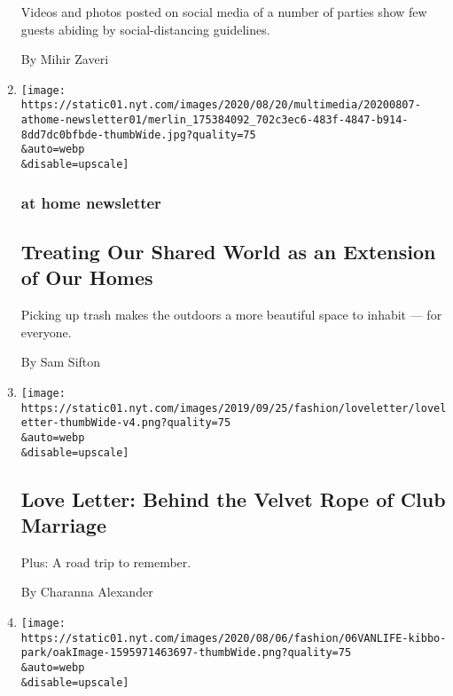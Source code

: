 \begin{enumerate}
  Videos and photos posted on social media of a number of parties show
  few guests abiding by social-distancing guidelines.

  By Mihir Zaveri
\item
  \href{/2020/08/07/at-home/newsletter.html}{}

  \texttt{[image: https://static01.nyt.com/images/2020/08/20/multimedia/20200807-athome-newsletter01/merlin\_175384092\_702c3ec6-483f-4847-b914-8dd7dc0bfbde-thumbWide.jpg?quality=75\\\&auto=webp\\\&disable=upscale]}

  \hypertarget{at-home-newsletter}{%
  \subsubsection{at home newsletter}\label{at-home-newsletter}}

  \hypertarget{treating-our-shared-world-as-an-extension-of-our-homes}{%
  \subsection{Treating Our Shared World as an Extension of Our
  Homes}\label{treating-our-shared-world-as-an-extension-of-our-homes}}

  Picking up trash makes the outdoors a more beautiful space to inhabit
  --- for everyone.

  By Sam Sifton
\item
  \href{/2020/08/07/style/love-letter-newsletter-behind-the-velvet-rope-of-club-marriage.html}{}

  \texttt{[image: https://static01.nyt.com/images/2019/09/25/fashion/loveletter/loveletter-thumbWide-v4.png?quality=75\\\&auto=webp\\\&disable=upscale]}

  \hypertarget{love-letter-behind-the-velvet-rope-of-club-marriage-1}{%
  \subsection{Love Letter: Behind the Velvet Rope of Club
  Marriage}\label{love-letter-behind-the-velvet-rope-of-club-marriage-1}}

  Plus: A road trip to remember.

  By Charanna Alexander
\item
  \href{/2020/08/07/style/kibbo-van-life-startup.html}{}

  \texttt{[image: https://static01.nyt.com/images/2020/08/06/fashion/06VANLIFE-kibbo-park/oakImage-1595971463697-thumbWide.png?quality=75\\\&auto=webp\\\&disable=upscale]}


\end{enumerate}
